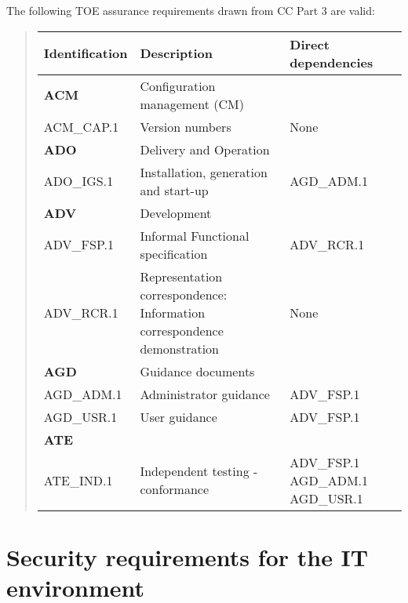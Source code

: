 \documentclass[12pt,english]{scrbook}
\begin{document}
The following TOE assurance requirements drawn from CC Part 3 are valid:
\begin{quote}

\begin{longtable}[c]{|l|l|l|}
\hline
\textbf{
Identification
} & \textbf{
Description
} & \textbf{
Direct dependencies
} \\
\hline
\endhead

\textbf{ACM}
 & 
Configuration management (CM)
 &  \\
\hline

ACM{\_}CAP.1
 & 
Version numbers
 & 
None
 \\
\hline

\textbf{ADO}
 & 
Delivery and Operation
 &  \\
\hline

ADO{\_}IGS.1
 & 
Installation, generation and start-up
 & 
AGD{\_}ADM.1
 \\
\hline

\textbf{ADV}
 & 
Development
 &  \\
\hline

ADV{\_}FSP.1
 & 
Informal Functional specification
 & 
ADV{\_}RCR.1
 \\
\hline

ADV{\_}RCR.1
 & 
Representation correspondence:
Information correspondence
demonstration
 & 
None
 \\
\hline

\textbf{AGD}
 & 
Guidance documents
 &  \\
\hline

AGD{\_}ADM.1
 & 
Administrator guidance
 & 
ADV{\_}FSP.1
 \\
\hline

AGD{\_}USR.1
 & 
User guidance
 & 
ADV{\_}FSP.1
 \\
\hline

\textbf{ATE}
 &  &  \\
\hline

ATE{\_}IND.1
 & 
Independent testing - conformance
 & 
ADV{\_}FSP.1
AGD{\_}ADM.1
AGD{\_}USR.1
 \\
\hline
\end{longtable}
\end{quote}





\section{Security requirements for the IT environment}
\end{document}
